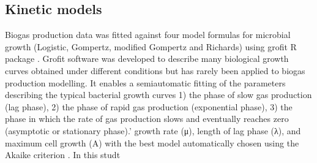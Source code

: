\subsection{Kinetic models}
Biogas production data was fitted against four model formulas for microbial growth (Logistic, Gompertz, modified Gompertz and Richards) using grofit R package \cite{Kahm_2010}. Grofit software was developed to describe many biological growth curves obtained under different conditions but has rarely been applied to biogas production modelling. It enables a semiautomatic fitting of the parameters describing the typical bacterial growth curves 1) the phase of slow gas production (lag phase), 2) the phase of rapid gas production (exponential phase), 3) the phase in which the rate of gas production slows and eventually reaches zero (asymptotic or stationary phase).’ growth rate (μ), length of lag phase (λ), and maximum cell growth (A) with the best model automatically chosen using the Akaike criterion \cite{Hasenbrink_2006}. In this studt